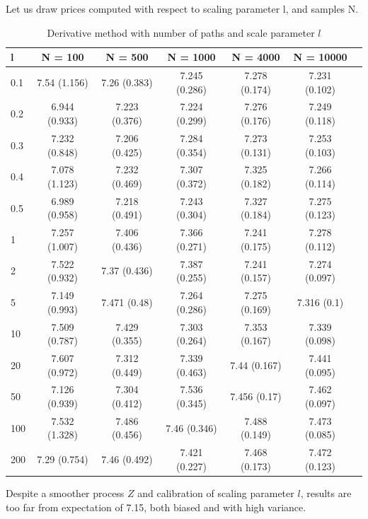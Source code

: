\documentclass[english,11pt,openany]{report}
\theoremstyle{definition}
\theoremstyle{plain}
\theoremstyle{definition}
\begin{document}
Let us draw prices computed with respect to scaling parameter l, and samples N.

\begin{table}[H]
	\centering
	\caption{Derivative method with number of paths and scale parameter $l$}
	\label{table:derivative}
	\begin{tabular}{|l|c|c|c|c|c|c|}\hline
		l & N = 100           & N = 500           & N = 1000          & N = 4000          & N = 10000         \\
		\hline
		0.1 &7.54 (1.156)  & 7.26 (0.383)  & 7.245 (0.286) & 7.278 (0.174) & 7.231 (0.102) \\\hline
		0.2 & 6.944 (0.933) & 7.223 (0.376) & 7.224 (0.299) & 7.276 (0.176) & 7.249 (0.118) \\\hline
		0.3 & 7.232 (0.848) & 7.206 (0.425) & 7.284 (0.354) & 7.273 (0.131) & 7.253 (0.103) \\\hline
		0.4 & 7.078 (1.123) & 7.232 (0.469) & 7.307 (0.372) & 7.325 (0.182) & 7.266 (0.114) \\\hline
		0.5 & 6.989 (0.958) & 7.218 (0.491) & 7.243 (0.304) & 7.327 (0.184) & 7.275 (0.123) \\\hline
		1 & 7.257 (1.007) & 7.406 (0.436) & 7.366 (0.271) & 7.241 (0.175) & 7.278 (0.112) \\\hline
		2 & 7.522 (0.932) & 7.37 (0.436)  & 7.387 (0.255) & 7.241 (0.157) & 7.274 (0.097) \\\hline
		5 & 7.149 (0.993) & 7.471 (0.48)  & 7.264 (0.286) & 7.275 (0.169) & 7.316 (0.1)   \\\hline
		10 & 7.509 (0.787) & 7.429 (0.355) & 7.303 (0.264) & 7.353 (0.167) & 7.339 (0.098) \\\hline
		20 & 7.607 (0.972) & 7.312 (0.449) & 7.339 (0.463) & 7.44 (0.167)  & 7.441 (0.095) \\\hline
		50 & 7.126 (0.939) & 7.304 (0.412) & 7.536 (0.345) & 7.456 (0.17)  & 7.462 (0.097) \\\hline
		100 & 7.532 (1.328) & 7.486 (0.456) & 7.46 (0.346)  & 7.488 (0.149) & 7.473 (0.085) \\\hline
		200 & 7.29 (0.754)  & 7.46 (0.492)  & 7.421 (0.227) & 7.468 (0.173) & 7.472 (0.123) \\\hline
		\hline
	\end{tabular}
\end{table}

Despite a smoother process $Z$ and calibration of scaling parameter $l$, results are too far from expectation of 7.15, both biased and with high variance. 
\end{document}
